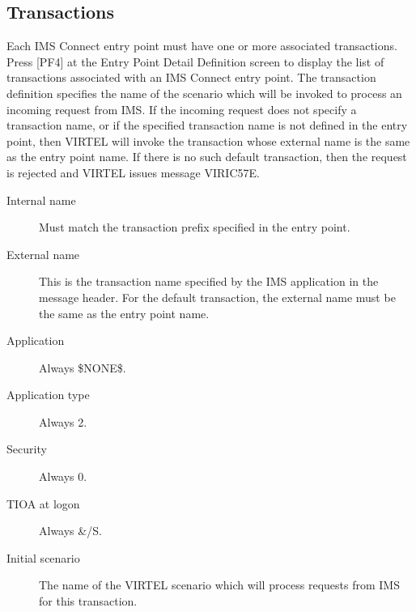 \documentclass[letterpaper,10pt,english]{sphinxmanual}
\begin{document}

\subsection{Transactions}
\label{\detokenize{connectivity_guide:index-25}}\label{\detokenize{connectivity_guide:transactions}}
Each IMS Connect entry point must have one or more associated transactions. Press {[}PF4{]} at the Entry Point Detail Definition screen to display the list of transactions associated with an IMS Connect entry point. The transaction definition specifies the name of the scenario which will be invoked to process an incoming request from IMS. If the incoming request does not specify a transaction name, or if the specified transaction name is not defined in the entry point, then VIRTEL will invoke the transaction whose external name is the same as the entry point name. If there is no such default transaction, then the request is rejected and VIRTEL issues message VIRIC57E.

\begin{description}
\item[{Internal name}] \leavevmode
Must match the transaction prefix specified in the entry point.

\item[{External name}] \leavevmode
This is the transaction name specified by the IMS application in the
message header. For the default transaction, the external name must
be the same as the entry point name.

\item[{Application}] \leavevmode
Always \$NONE\$.

\item[{Application type}] \leavevmode
Always 2.

\item[{Security}] \leavevmode
Always 0.

\item[{TIOA at logon}] \leavevmode
Always \&/S.

\item[{Initial scenario}] \leavevmode
The name of the VIRTEL scenario which will process requests from IMS
for this transaction.

\end{description}

\end{document}
